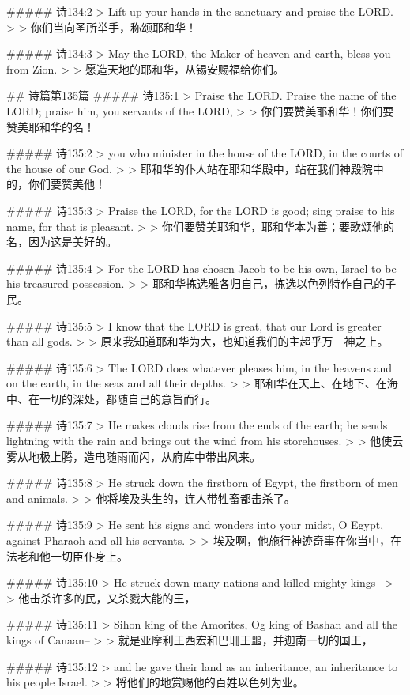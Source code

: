 ##### 诗134:2
> Lift up your hands in the sanctuary and praise the LORD.
>
> 你们当向圣所举手，称颂耶和华！


##### 诗134:3
> May the LORD, the Maker of heaven and earth, bless you from Zion.
>
> 愿造天地的耶和华，从锡安赐福给你们。


## 诗篇第135篇
##### 诗135:1
> Praise the LORD. Praise the name of the LORD; praise him, you servants of the LORD,
>
> 你们要赞美耶和华！你们要赞美耶和华的名！


##### 诗135:2
> you who minister in the house of the LORD, in the courts of the house of our God.
>
> 耶和华的仆人站在耶和华殿中，站在我们神殿院中的，你们要赞美他！


##### 诗135:3
> Praise the LORD, for the LORD is good; sing praise to his name, for that is pleasant.
>
> 你们要赞美耶和华，耶和华本为善；要歌颂他的名，因为这是美好的。


##### 诗135:4
> For the LORD has chosen Jacob to be his own, Israel to be his treasured possession.
>
> 耶和华拣选雅各归自己，拣选以色列特作自己的子民。


##### 诗135:5
> I know that the LORD is great, that our Lord is greater than all gods.
>
> 原来我知道耶和华为大，也知道我们的主超乎万　神之上。


##### 诗135:6
> The LORD does whatever pleases him, in the heavens and on the earth, in the seas and all their depths.
>
> 耶和华在天上、在地下、在海中、在一切的深处，都随自己的意旨而行。


##### 诗135:7
> He makes clouds rise from the ends of the earth; he sends lightning with the rain and brings out the wind from his storehouses.
>
> 他使云雾从地极上腾，造电随雨而闪，从府库中带出风来。


##### 诗135:8
> He struck down the firstborn of Egypt, the firstborn of men and animals.
>
> 他将埃及头生的，连人带牲畜都击杀了。


##### 诗135:9
> He sent his signs and wonders into your midst, O Egypt, against Pharaoh and all his servants.
>
> 埃及啊，他施行神迹奇事在你当中，在法老和他一切臣仆身上。


##### 诗135:10
> He struck down many nations and killed mighty kings--
>
> 他击杀许多的民，又杀戮大能的王，


##### 诗135:11
> Sihon king of the Amorites, Og king of Bashan and all the kings of Canaan--
>
> 就是亚摩利王西宏和巴珊王噩，并迦南一切的国王，


##### 诗135:12
> and he gave their land as an inheritance, an inheritance to his people Israel.
>
> 将他们的地赏赐他的百姓以色列为业。


